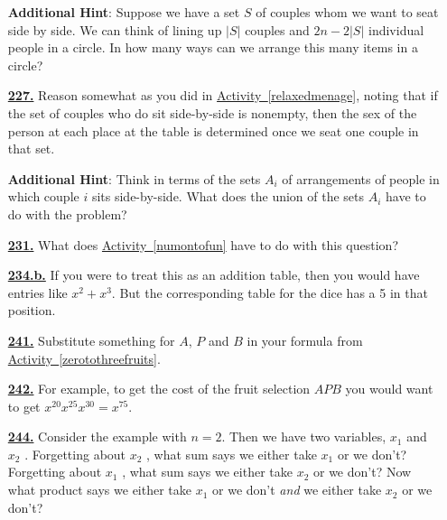 \documentclass[10pt,]{book}
\theoremstyle{plain}
\theoremstyle{definition}
\theoremstyle{definition}
\theoremstyle{definition}
\numberwithin{equation}{chapter}
\begin{document}
\begin{itemize}[itemsep=1em]
\par\smallskip
\noindent\textbf{Additional Hint}: \hypertarget{p-1213}{}%
Suppose we have a set \(S\) of couples whom we want to seat side by side. We can think of lining up \(|S|\) couples and \(2n - 2|S|\) individual people in a circle.  In how many ways can we arrange this many items in a circle?%

\hypertarget{a-227}{}\item[\textbf{\hyperref[activity-220]{227.}}]
\hypertarget{p-1216}{}%
Reason somewhat as you did in \hyperref[relaxedmenage]{Activity~\ref{relaxedmenage}}, noting that if the set of couples who do sit side-by-side is nonempty, then the sex of the person at each place at the table is determined once we seat one couple in that set.%

\par\smallskip
\noindent\textbf{Additional Hint}: \hypertarget{p-1217}{}%
Think in terms of the sets \(A_i\) of arrangements of people in which couple \(i\) sits side-by-side. What does the union of the sets \(A_i\) have to do with the problem?%

\hypertarget{a-231}{}\item[\textbf{\hyperref[act_stirlingpie]{231.}}]
\hypertarget{p-1232}{}%
What does \hyperref[numontofun]{Activity~\ref{numontofun}} have to do with this question?%

\hypertarget{a-234.b}{}\item[\textbf{\hyperref[task-239]{234.b.}}]
\hypertarget{p-1249}{}%
If you were to treat this as an addition table, then you would have entries like \(x^2+x^3\).  But the corresponding table for the dice has a 5 in that position.%

\hypertarget{a-241}{}\item[\textbf{\hyperref[activity-234]{241.}}]
\hypertarget{p-1273}{}%
Substitute something for \(A\), \(P\) and \(B\) in your formula from \hyperref[zerotothreefruits]{Activity~\ref{zerotothreefruits}}.%

\hypertarget{a-242}{}\item[\textbf{\hyperref[activity-235]{242.}}]
\hypertarget{p-1276}{}%
For example, to get the cost of the fruit selection \(AP B\) you would want to get \(x^{20} x^{25} x^{30} = x^{75}\).%

\hypertarget{a-244}{}\item[\textbf{\hyperref[reprovingbinomialtheorem]{244.}}]
\hypertarget{p-1281}{}%
Consider the example with \(n = 2\). Then we have two variables, \(x_1\) and \(x_2\) .  Forgetting about \(x_2\) , what sum says we either take \(x_1\) or we don't? Forgetting about \(x_1\) , what sum says we either take \(x_2\) or we don't? Now what product says we either take \(x_1\) or we don't \emph{and} we either take \(x_2\) or we don't?%


\end{itemize}
\end{document}

